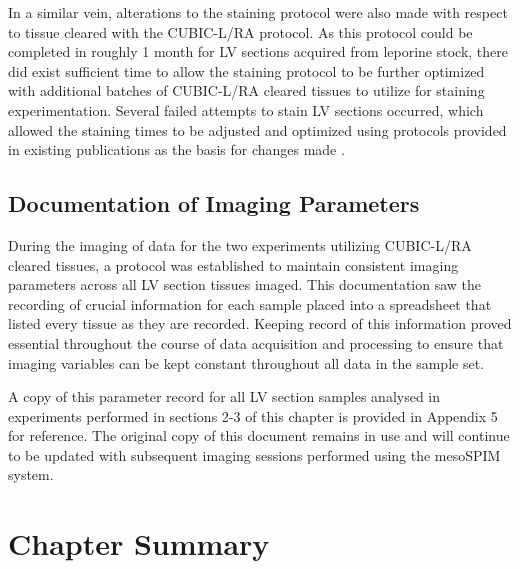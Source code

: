 In a similar vein, alterations to the staining protocol were also made with respect to tissue cleared with the CUBIC-L/RA protocol. As this protocol could be completed in roughly 1 month for LV sections acquired from leporine stock, there did exist sufficient time to allow the staining protocol to be further optimized with additional batches of CUBIC-L/RA cleared tissues to utilize for staining experimentation. Several failed attempts to stain LV sections occurred, which allowed the staining times to be adjusted and optimized using protocols provided in existing publications as the basis for changes made \cite{ueda_cubic_nodate, sands_its_2022}.   

\subsection{Documentation of Imaging Parameters}

During the imaging of data for the two experiments utilizing CUBIC-L/RA cleared tissues, a protocol was established to maintain consistent imaging parameters across all LV section tissues imaged. This documentation saw the recording of crucial information for each sample placed into a spreadsheet that listed every tissue as they are recorded. Keeping record of this information proved essential throughout the course of data acquisition and processing to ensure that imaging variables can be kept constant throughout all data in the sample set. 

A copy of this parameter record for all LV section samples analysed in experiments performed in sections 2-3 of this chapter is provided in Appendix 5 for reference. The original copy of this document remains in use and will continue to be updated with subsequent imaging sessions performed using the mesoSPIM system.


\section{Chapter Summary}

